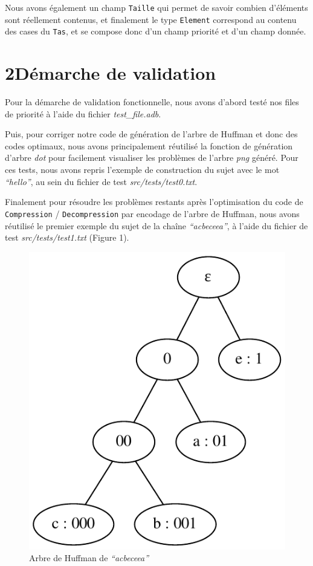 \documentclass [a4paper,11pt] {report}
\begin{document}
Nous avons également un champ \lstinline!Taille! qui permet de savoir combien d'éléments sont réellement contenus, et finalement le type \lstinline!Element! correspond au contenu des cases du \lstinline!Tas!, et se compose donc d'un champ priorité et d'un champ donnée.





\section* {2\hspace{5mm}Démarche de validation }

Pour la démarche de validation fonctionnelle, nous avons d'abord testé nos files de priorité à l'aide du fichier \textit{test\_file.adb}.

Puis, pour corriger notre code de génération de l'arbre de Huffman et donc des codes optimaux, nous avons principalement réutilisé la fonction de génération d'arbre \textit{dot} pour facilement visualiser les problèmes de l'arbre \textit{png} généré. Pour ces tests, nous avons repris l'exemple de construction du sujet avec le mot \textit{``hello''}, au sein du fichier de test \textit{src/tests/test0.txt}.

\newpage

Finalement pour résoudre les problèmes restants après l'optimisation du code de \lstinline!Compression! / \lstinline!Decompression! par encodage de l'arbre de Huffman, nous avons réutilisé le premier exemple du sujet de la chaîne \textit{``acbeceea''}, à l'aide du fichier de test \textit{src/tests/test1.txt} (Figure 1).

\begin{figure}[ht]
\begin{center}
  \includegraphics[scale=0.75]{test1.pdf}
 \caption{Arbre de Huffman de \textit{``acbeceea''}}
\end{center}
\end{figure}
\end{document}
